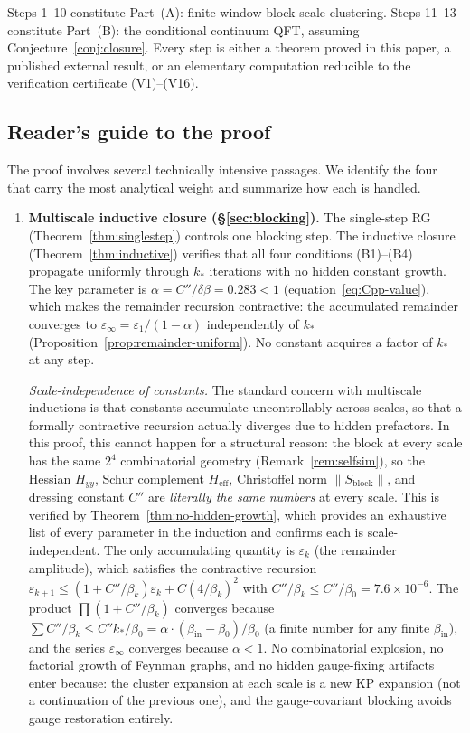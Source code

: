 \documentclass[11pt]{article}
\theoremstyle{definition}
\begin{document}
\noindent
Steps 1--10 constitute Part~(A): finite-window block-scale clustering.
Steps 11--13 constitute Part~(B): the conditional continuum QFT, assuming Conjecture~\ref{conj:closure}.
Every step is either a theorem proved in this paper,
a published external result, or an elementary computation
reducible to the verification certificate (V1)--(V16).

\subsection{Reader's guide to the proof}%
\label{subsec:proof-guide}

The proof involves several technically intensive passages.
We identify the four that carry the most analytical weight
and summarize how each is handled.

\begin{enumerate}[label=\textbf{(\arabic*)}]
\item \textbf{Multiscale inductive closure
(\S\ref{sec:blocking}).}
The single-step RG (Theorem~\ref{thm:singlestep}) controls
one blocking step.
The inductive closure (Theorem~\ref{thm:inductive})
verifies that all four conditions
(B1)--(B4) propagate uniformly through $k_*$
iterations with no hidden constant growth.
The key parameter is $\alpha=C''/\delta\beta=0.283<1$
(equation~\eqref{eq:Cpp-value}), which makes the
remainder recursion contractive: the accumulated
remainder converges to
$\varepsilon_\infty=\varepsilon_1/(1-\alpha)$
independently of $k_*$
(Proposition~\ref{prop:remainder-uniform}).
No constant acquires a factor of $k_*$ at any step.

\emph{Scale-independence of constants.}
The standard concern with multiscale inductions is that
constants accumulate uncontrollably across scales, so that
a formally contractive recursion actually diverges due to
hidden prefactors.  In this proof, this cannot happen for
a structural reason: the block at every scale has the
same $2^4$ combinatorial geometry
(Remark~\ref{rem:selfsim}), so the Hessian $H_{yy}$,
Schur complement $H_{\mathrm{eff}}$, Christoffel norm
$\|S_{\mathrm{block}}\|$, and dressing constant $C''$ are
\emph{literally the same numbers} at every scale.
This is verified by Theorem~\ref{thm:no-hidden-growth},
which provides an exhaustive list of every parameter in
the induction and confirms each is scale-independent.
The only accumulating quantity is $\varepsilon_k$
(the remainder amplitude), which satisfies the
contractive recursion
$\varepsilon_{k+1}\le(1+C''/\beta_k)\varepsilon_k
+C(4/\beta_k)^2$
with $C''/\beta_k\le C''/\beta_0=7.6\times 10^{-6}$.
The product $\prod(1+C''/\beta_k)$ converges because
$\sum C''/\beta_k\le C''k_*/\beta_0
=\alpha\cdot(\beta_{\mathrm{in}}-\beta_0)/\beta_0$
(a finite number for any finite $\beta_{\mathrm{in}}$),
and the series $\varepsilon_\infty$ converges because
$\alpha<1$.  No combinatorial explosion, no factorial
growth of Feynman graphs, and no hidden gauge-fixing
artifacts enter because: the cluster expansion at each
scale is a new KP expansion (not a continuation
of the previous one), and the gauge-covariant blocking
avoids gauge restoration entirely.


\end{enumerate}
\end{document}
